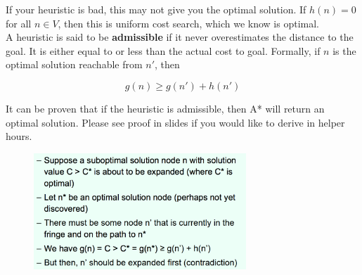 \documentclass[letterpaper]{article} %
\begin{document}
If your heuristic is bad, this may not give you the optimal solution. If $h(n) = 0$ for all $n \in V$, then this is uniform cost search, which we know is optimal.\\

A heuristic is said to be \textbf{admissible} if it never overestimates the distance to the goal. It is either equal to or less than the actual cost to goal. Formally, if $n$ is the optimal solution reachable from $n'$, then 

$$g(n) \geq g(n') + h(n')$$

It can be proven that if the heuristic is admissible, then A* will return an optimal solution. Please see proof in slides if you would like to derive in helper hours.

\begin{figure}[h]
\includegraphics[width=8cm]{proof.png}
\centering
\end{figure}
\end{document}
